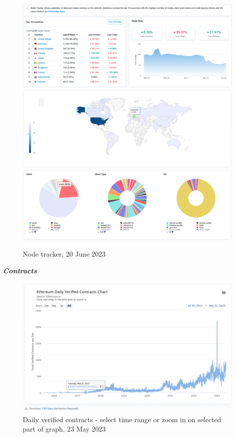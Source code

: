 \documentclass[UTF8]{article}
\begin{document}
\begin{figure}[htbp]
\begin{center}
\includegraphics[width=0.9\linewidth]{images/nodetrk1} \\
\includegraphics[width=0.9\linewidth]{images/nodetrk2} \\
\includegraphics[width=0.9\linewidth]{images/nodetrk3}
\caption{Node tracker, 20 June 2023}
\label{fig:nodetrk}
\end{center}
\end{figure}

\clearpage

\textit{\textbf{Contracts}}
\begin{figure}[htbp]
\begin{center}
\includegraphics[width=0.9\linewidth]{images/dailyverified}
\caption{Daily verified contracts - select time range or zoom in on selected part of graph, 23 May 2023}
\label{fig:dailyverified}
\end{center}
\end{figure}
\end{document}
